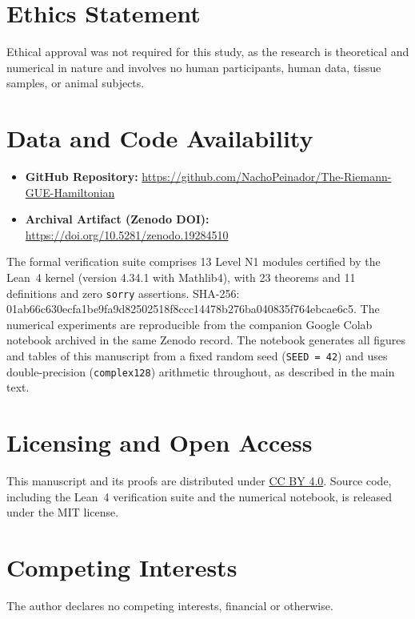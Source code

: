 \documentclass[11pt,a4paper]{article}
\begin{document}
\section*{Ethics Statement}
Ethical approval was not required for this study, as the research is
theoretical and numerical in nature and involves no human participants,
human data, tissue samples, or animal subjects.

\section*{Data and Code Availability}
\begin{itemize}
    \item \textbf{GitHub Repository:} \url{https://github.com/NachoPeinador/The-Riemann-GUE-Hamiltonian}
    \item \textbf{Archival Artifact (Zenodo DOI):} \url{https://doi.org/10.5281/zenodo.19284510}
\end{itemize}
The formal verification suite comprises 13 Level N1 modules certified by
the Lean~4 kernel (version 4.34.1 with Mathlib4), with 23 theorems and 11
definitions and zero \texttt{sorry} assertions.
SHA-256: 01ab66c630ecfa1be9fa9d82502518f8ccc14478b276ba040835f764ebcae6c5.
The numerical experiments
are reproducible from the companion Google Colab notebook archived in the
same Zenodo record. The notebook generates all figures and tables of this
manuscript from a fixed random seed (\texttt{SEED = 42}) and uses
double-precision (\texttt{complex128}) arithmetic throughout, as described
in the main text.

\section*{Licensing and Open Access}
This manuscript and its proofs are distributed under
\href{https://creativecommons.org/licenses/by/4.0/}{CC BY 4.0}. Source
code, including the Lean~4 verification suite and the numerical notebook,
is released under the MIT license.

\section*{Competing Interests}
The author declares no competing interests, financial or otherwise.
\end{document}
